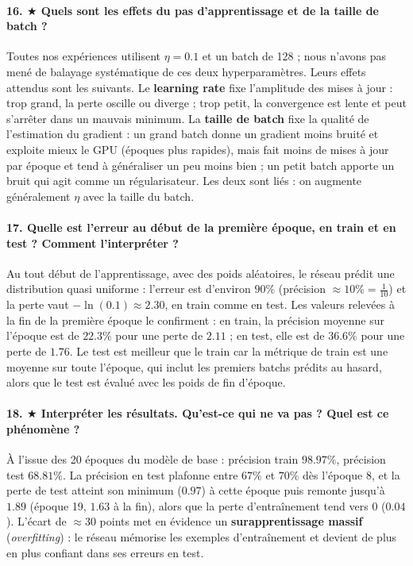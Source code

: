 \documentclass{report}
\begin{document}
\paragraph{16. $\bigstar$ Quels sont les effets du pas d'apprentissage et de la taille de batch ?}
 Toutes nos expériences utilisent $\eta = 0.1$ et un batch de 128 ; nous n'avons pas mené de balayage systématique de ces deux hyperparamètres. Leurs effets attendus sont les suivants. Le \textbf{learning rate} fixe l'amplitude des mises à jour : trop grand, la perte oscille ou diverge ; trop petit, la convergence est lente et peut s'arrêter dans un mauvais minimum. La \textbf{taille de batch} fixe la qualité de l'estimation du gradient : un grand batch donne un gradient moins bruité et exploite mieux le GPU (époques plus rapides), mais fait moins de mises à jour par époque et tend à généraliser un peu moins bien ; un petit batch apporte un bruit qui agit comme un régularisateur. Les deux sont liés : on augmente généralement $\eta$ avec la taille du batch.

\paragraph{17. Quelle est l'erreur au début de la première époque, en train et en test ? Comment l'interpréter ?}
 Au tout début de l'apprentissage, avec des poids aléatoires, le réseau prédit une distribution quasi uniforme : l'erreur est d'environ $90\%$ (précision $\approx 10\% = \frac{1}{10}$) et la perte vaut $-\ln(0.1) \approx 2.30$, en train comme en test. Les valeurs relevées à la fin de la première époque le confirment : en train, la précision moyenne sur l'époque est de $22.3\%$ pour une perte de $2.11$ ; en test, elle est de $36.6\%$ pour une perte de $1.76$. Le test est meilleur que le train car la métrique de train est une moyenne sur toute l'époque, qui inclut les premiers batchs prédits au hasard, alors que le test est évalué avec les poids de fin d'époque.

\paragraph{18. $\bigstar$ Interpréter les résultats. Qu'est-ce qui ne va pas ? Quel est ce phénomène ?}
 À l'issue des 20 époques du modèle de base : précision train $98.97\%$, précision test $68.81\%$. La précision en test plafonne entre $67\%$ et $70\%$ dès l'époque 8, et la perte de test atteint son minimum ($0.97$) à cette époque puis remonte jusqu'à $1.89$ (époque 19, $1.63$ à la fin), alors que la perte d'entraînement tend vers 0 ($0.04$). L'écart de $\approx 30$ points met en évidence un \textbf{surapprentissage massif} (\textit{overfitting}) : le réseau mémorise les exemples d'entraînement et devient de plus en plus confiant dans ses erreurs en test.
\end{document}
